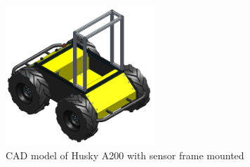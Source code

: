 \begin{figure}[htp]
  \centering
  \includegraphics[width = 0.5\textwidth]{Figures/husky_with_frame.png}
  \caption{CAD model of Husky A200 with sensor frame mounted}
  \label{fig:M:H:AMF:userFrame}
\end{figure}





